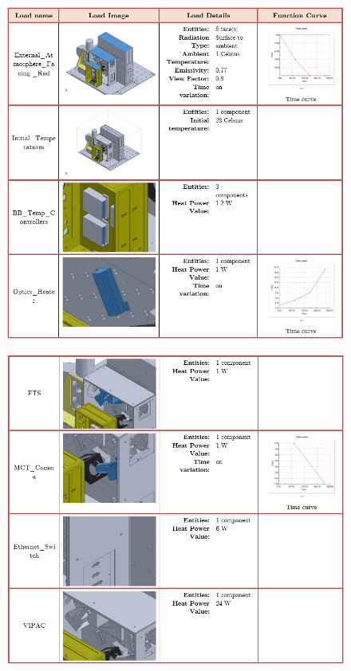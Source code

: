 \begin{figure}[h!]
    \centering
    \includegraphics[width=\textwidth]{thermal_load_images/ascent_pt1_TL_images/ascesnt_pt1_1.PNG}
\end{figure}

\begin{figure}
    \centering
    \includegraphics[width=\textwidth]{thermal_load_images/ascent_pt1_TL_images/ascesnt_pt1_2.png}
\end{figure}

